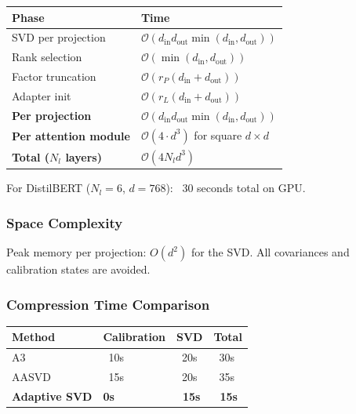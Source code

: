 \begin{table}[H]
\centering
\small
\begin{tabular}{ll}
\toprule
\textbf{Phase} & \textbf{Time} \\
\midrule
SVD per projection & $\mathcal{O}(d_\text{in} d_\text{out} \min(d_\text{in}, d_\text{out}))$ \\
Rank selection & $\mathcal{O}(\min(d_\text{in}, d_\text{out}))$ \\
Factor truncation & $\mathcal{O}(r_P (d_\text{in} + d_\text{out}))$ \\
Adapter init & $\mathcal{O}(r_L (d_\text{in} + d_\text{out}))$ \\
\textbf{Per projection} & $\mathcal{O}(d_\text{in} d_\text{out} \min(d_\text{in}, d_\text{out}))$ \\
\textbf{Per attention module} & $\mathcal{O}(4 \cdot d^3)$ for square $d \times d$ \\
\textbf{Total ($N_l$ layers)} & $\mathcal{O}(4 N_l d^3)$ \\
\bottomrule
\end{tabular}
\end{table}

For DistilBERT ($N_l = 6$, $d = 768$): ~30 seconds total on GPU.

\subsubsection{Space Complexity}

Peak memory per projection: $O(d^2)$ for the SVD. All covariances 
and calibration states are avoided.

\subsubsection{Compression Time Comparison}

\begin{table}[H]
\centering
\small
\begin{tabular}{llll}
\toprule
\textbf{Method} & \textbf{Calibration} & \textbf{SVD} & \textbf{Total} \\
\midrule
A3 & ~10s & ~20s & ~30s \\
AASVD & ~15s & ~20s & ~35s \\
\textbf{Adaptive SVD} & \textbf{0s} & \textbf{~15s} & \textbf{~15s} \\
\bottomrule
\end{tabular}
\end{table}

